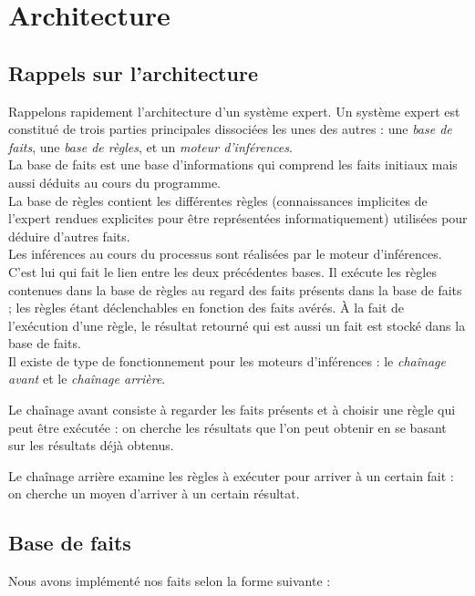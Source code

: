 \documentclass[a4paper,12pt]{article}
\begin{document}
	
\section{Architecture}

\subsection{Rappels sur l'architecture}
Rappelons rapidement l'architecture d'un système expert.
Un système expert est constitué de trois parties principales dissociées les unes des autres : une \textit{base de faits}, une \textit{base de règles}, et un \textit{moteur d'inférences}.\\

La base de faits est une base d'informations qui comprend les faits initiaux mais aussi déduits au cours du programme.\\

La base de règles contient les différentes règles (connaissances implicites de l'expert rendues explicites pour être représentées informatiquement) utilisées pour déduire d'autres faits.\\

Les inférences au cours du processus sont réalisées par le moteur d'inférences. C'est lui qui fait le lien entre les deux précédentes bases. Il exécute les règles contenues dans la base de règles au regard des faits présents dans la base de faits ; les règles étant déclenchables en fonction des faits avérés. À la fait de l'exécution d'une règle, le résultat retourné qui est aussi un fait est stocké dans la base de faits.\\

Il existe de type de fonctionnement pour les moteurs d'inférences : le \textit{chaînage avant} et le \textit{chaînage arrière}.

Le chaînage avant consiste à regarder les faits présents et à choisir une règle qui peut être exécutée : on cherche les résultats que l'on peut obtenir en se basant sur les résultats déjà obtenus.

Le chaînage arrière examine les règles à exécuter pour arriver à un certain fait : on cherche un moyen d'arriver à un certain résultat.

\subsection{Base de faits}

Nous avons implémenté nos faits selon la forme suivante :
\end{document}
